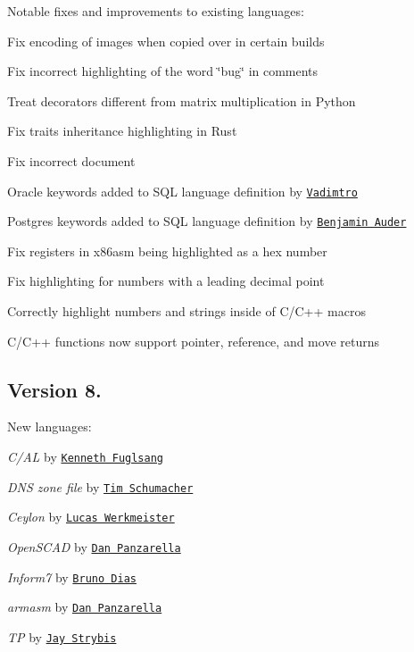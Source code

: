 Notable fixes and improvements to existing languages\+:


\begin{DoxyItemize}
\item Fix encoding of images when copied over in certain builds
\item Fix incorrect highlighting of the word \char`\"{}bug\char`\"{} in comments
\item Treat decorators different from matrix multiplication in Python
\item Fix traits inheritance highlighting in Rust
\item Fix incorrect document
\item Oracle keywords added to S\+QL language definition by \href{https://github.com/Vadimtro}{\tt Vadimtro}
\item Postgres keywords added to S\+QL language definition by \href{https://github.com/ghost}{\tt Benjamin Auder}
\item Fix registers in x86asm being highlighted as a hex number
\item Fix highlighting for numbers with a leading decimal point
\item Correctly highlight numbers and strings inside of C/\+C++ macros
\item C/\+C++ functions now support pointer, reference, and move returns
\end{DoxyItemize}

\subsection*{Version 8.}

New languages\+:


\begin{DoxyItemize}
\item {\itshape C/\+AL} by \href{https://github.com/kfuglsang}{\tt Kenneth Fuglsang}
\item {\itshape D\+NS zone file} by \href{https://github.com/enko}{\tt Tim Schumacher}
\item {\itshape Ceylon} by \href{https://github.com/lucaswerkmeister}{\tt Lucas Werkmeister}
\item {\itshape Open\+S\+C\+AD} by \href{https://github.com/pzl}{\tt Dan Panzarella}
\item {\itshape Inform7} by \href{https://github.com/sequitur}{\tt Bruno Dias}
\item {\itshape armasm} by \href{https://github.com/pzl}{\tt Dan Panzarella}
\item {\itshape TP} by \href{https://github.com/unreal}{\tt Jay Strybis}
\end{DoxyItemize}

